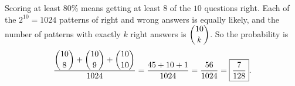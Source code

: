 Scoring at least $80\%$ means getting at least $8$ of the $10$ questions right. Each of the $2^{10}=1024$ patterns of right and wrong answers is equally likely, and the number of patterns with exactly $k$ right answers is $\dbinom{10}{k}$. So the probability is
\[\dfrac{\dbinom{10}{8}+\dbinom{10}{9}+\dbinom{10}{10}}{1024}=\dfrac{45+10+1}{1024}=\dfrac{56}{1024}=\boxed{\dfrac{7}{128}}.\]
